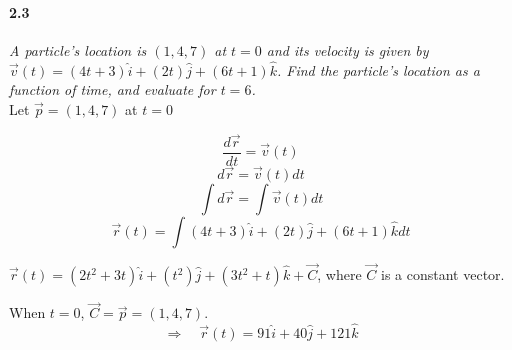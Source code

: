 \documentclass[12pt, letterpaper]{article}
\begin{document}
		\begin{center}
		\end{center}
		
	\paragraph{2.3}
		\textit{A particle's location is $(1,4,7)$ at $t = 0$ and its velocity is given by $\vec{v}(t) = (4t +3)\hat{i} + (2t)\hat{j} + (6t + 1)\hat{k}$. Find the particle's location as a function of time, and evaluate for $t=6$.}\\	
		
		Let $\vec{p} = (1,4,7)$ at $t=0$
		
		$$
			\frac{d\vec{r}}{dt} = \vec{v}(t)
		$$
		$$	
			d\vec{r} = \vec{v}(t)dt
		$$	
		$$	
			\int d\vec{r} = \int \vec{v}(t)dt
		$$
		$$	
			\vec{r}(t) = \int (4t +3)\hat{i} + (2t)\hat{j} + (6t + 1)\hat{k}dt
		$$
		\begin{center}
			$\vec{r}(t) = (2t^2 + 3t)\hat{i} + (t^2)\hat{j} + (3t^2 + t)\hat{k} + 
			\vec{C}$, where $\vec{C}$ is a constant vector.	
		\end{center}	
		
		When $t=0$, $\vec{C}=\vec{p}=(1,4,7)$.
		$$
			\Rightarrow\quad \vec{r}(t) = 91\hat{i} + 40\hat{j} + 121\hat{k}
		$$	
		
		
\end{document}

